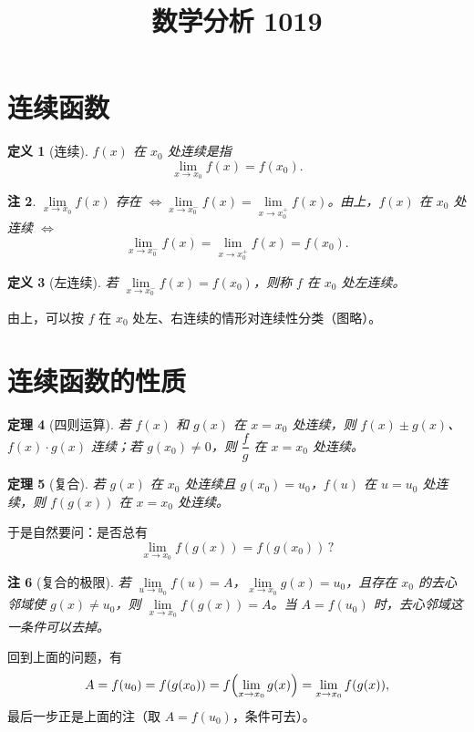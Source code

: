 \documentclass[UTF8,11pt]{ctexart}
\title{数学分析 1019}
\date{}
\theoremstyle{cnthm}
\newtheorem{thm}{定理}[section]
\newtheorem{defn}[thm]{定义}
\newtheorem{rem}[thm]{注}
\begin{document}
\maketitle

\section{连续函数}

\begin{defn}[连续]
$f(x)$ 在 $x_0$ 处连续是指
\[
\lim_{x\to x_0}f(x)=f(x_0).
\]
\end{defn}

\begin{rem}
$\lim\limits_{x\to x_0}f(x)$ 存在 $\iff\lim\limits_{x\to x_0^-}f(x)=\lim\limits_{x\to x_0^+}f(x)$。由上，$f(x)$ 在 $x_0$ 处连续 $\iff$
\[
\lim_{x\to x_0^-}f(x)=\lim_{x\to x_0^+}f(x)=f(x_0).
\]
\end{rem}

\begin{defn}[左连续]
若 $\lim\limits_{x\to x_0^-}f(x)=f(x_0)$，则称 $f$ 在 $x_0$ 处左连续。
\end{defn}

由上，可以按 $f$ 在 $x_0$ 处左、右连续的情形对连续性分类（图略）。

\section{连续函数的性质}

\begin{thm}[四则运算]
若 $f(x)$ 和 $g(x)$ 在 $x=x_0$ 处连续，则 $f(x)\pm g(x)$、$f(x)\cdot g(x)$ 连续；若 $g(x_0)\neq 0$，则 $\dfrac{f}{g}$ 在 $x=x_0$ 处连续。
\end{thm}

\begin{thm}[复合]
若 $g(x)$ 在 $x_0$ 处连续且 $g(x_0)=u_0$，$f(u)$ 在 $u=u_0$ 处连续，则 $f(g(x))$ 在 $x=x_0$ 处连续。
\end{thm}

于是自然要问：是否总有
\[
\lim_{x\to x_0}f(g(x))=f(g(x_0))\,?
\]

\begin{rem}[复合的极限]
若 $\lim\limits_{u\to u_0}f(u)=A$，$\lim\limits_{x\to x_0}g(x)=u_0$，且存在 $x_0$ 的去心邻域使 $g(x)\neq u_0$，则 $\lim\limits_{x\to x_0}f(g(x))=A$。当 $A=f(u_0)$ 时，去心邻域这一条件可以去掉。
\end{rem}

回到上面的问题，有
\[
A=f(u_0)=f(g(x_0))=f\Bigl(\lim_{x\to x_0}g(x)\Bigr)=\lim_{x\to x_0}f(g(x)),
\]
最后一步正是上面的注（取 $A=f(u_0)$，条件可去）。
\end{document}
